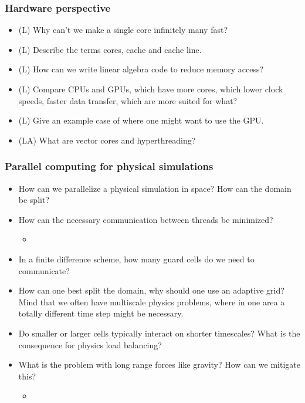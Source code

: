 \subsubsection*{Hardware perspective}
\begin{itemize}
    \item (L) Why can't we make a single core infinitely many fast?
    \item (L) Describe the terms cores, cache and cache line.
    \item (L) How can we write linear algebra code to reduce memory access?
    \item (L) Compare CPUs and GPUs, which have more cores, which lower clock speeds, faster data transfer, which are more suited for what?
    \item (L) Give an example case of where one might want to use the GPU.
    \item (LA) What are vector cores and hyperthreading?
\end{itemize}

\subsubsection*{Parallel computing for physical simulations}
\begin{itemize}
    \item How can we parallelize a physical simulation in space? How can the domain be split?
    \item How can the necessary communication between threads be minimized?
    \begin{itemize}
        \item {}
    \end{itemize}
    \item In a finite difference scheme, how many guard cells do we need to communicate?
    \item How can one best split the domain, why should one use an adaptive grid? Mind that we often have multiscale physics problems, where in
    one area a totally different time step might be necessary.
    \item Do smaller or larger cells typically interact on shorter timescales? What is the consequence for physics load balancing?
    \item What is the problem with long range forces like gravity? How can we mitigate this?
    \begin{itemize}
        \item {}
    \end{itemize}
\end{itemize}

